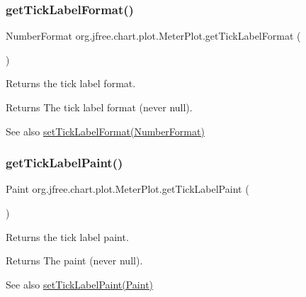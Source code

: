 \subsubsection{\texorpdfstring{get\+Tick\+Label\+Format()}{getTickLabelFormat()}}
{\footnotesize\ttfamily Number\+Format org.\+jfree.\+chart.\+plot.\+Meter\+Plot.\+get\+Tick\+Label\+Format (\begin{DoxyParamCaption}{ }\end{DoxyParamCaption})}

Returns the tick label format.

\begin{DoxyReturn}{Returns}
The tick label format (never {\ttfamily null}).
\end{DoxyReturn}
\begin{DoxySeeAlso}{See also}
\mbox{\hyperlink{classorg_1_1jfree_1_1chart_1_1plot_1_1_meter_plot_aafbb4bf29df5fb0818b1f8e4e4fc02e2}{set\+Tick\+Label\+Format(\+Number\+Format)}} 
\end{DoxySeeAlso}
\mbox{\label{classorg_1_1jfree_1_1chart_1_1plot_1_1_meter_plot_a3f1876a141990a24ca5d98e47dc9a245}} 
\subsubsection{\texorpdfstring{get\+Tick\+Label\+Paint()}{getTickLabelPaint()}}
{\footnotesize\ttfamily Paint org.\+jfree.\+chart.\+plot.\+Meter\+Plot.\+get\+Tick\+Label\+Paint (\begin{DoxyParamCaption}{ }\end{DoxyParamCaption})}

Returns the tick label paint.

\begin{DoxyReturn}{Returns}
The paint (never {\ttfamily null}).
\end{DoxyReturn}
\begin{DoxySeeAlso}{See also}
\mbox{\hyperlink{classorg_1_1jfree_1_1chart_1_1plot_1_1_meter_plot_af626b2132fcbeed2c4c900da682deb74}{set\+Tick\+Label\+Paint(\+Paint)}} 
\end{DoxySeeAlso}
\mbox{\label{classorg_1_1jfree_1_1chart_1_1plot_1_1_meter_plot_a79cddb55aadd6e29195297e9246f495d}} 
